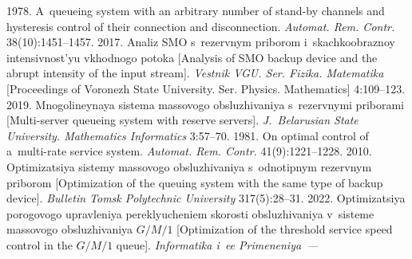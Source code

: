   



  


  \begin{multicols}{2}

\renewcommand{\bibname}{\protect\rmfamily References}

{\small\frenchspacing
 {%
 \begin{thebibliography}{9} 
   1978. A~queueing system with an arbitrary number of stand-by channels 
and hysteresis control of their connection and disconnection. \textit{Automat. Rem. Contr.} 
38(10):1451--1457.
   2017. Ana\-liz SMO s~re\-zerv\-nym 
pri\-bo\-rom i~skach\-ko\-ob\-raz\-noy in\-ten\-siv\-nost'yu vkhod\-no\-go po\-to\-ka [Analysis of SMO
 backup device and the abrupt intensity of the input stream]. \textit{Vestnik VGU. Ser. Fizika. 
Matematika} [Proceedings of Voronezh State University. Ser. Physics. Mathematics] 4:109--123.
   2019. Mno\-go\-li\-ney\-naya sis\-te\-ma mas\-so\-vo\-go ob\-slu\-zhi\-van\-iya s~re\-zerv\-ny\-mi 
pri\-bo\-ra\-mi [Multi-server queueing system with reserve servers]. \textit{J.~Belarusian State 
University. Mathematics Informatics} 3:57--70.
   1981. On optimal control of a~multi-rate service system. \textit{Automat. 
Rem. Contr.} 41(9):1221--1228.
   2010. Op\-ti\-mi\-za\-tsiya sis\-te\-my mas\-so\-vo\-go 
ob\-slu\-zhi\-van\-iya s~od\-no\-tip\-nym re\-zerv\-nym pri\-bo\-rom [Optimization of the queuing system with the 
same type of backup device]. \textit{Bulletin Tomsk Polytechnic University} 317(5):28--31.
   2022. Op\-ti\-mi\-za\-tsiya po\-ro\-go\-vo\-go uprav\-le\-niya pe\-reklyu\-che\-niem 
sko\-rosti ob\-slu\-zhi\-va\-niya v~sis\-te\-me mas\-so\-vo\-go ob\-slu\-zhi\-va\-niya $G/M/1$ [Optimization of the 
threshold service speed control in the $G/M/1$ queue]. \textit{Informatika i~ee Primeneniya~--- 
}
\end{thebibliography}}}
\end{multicols}
